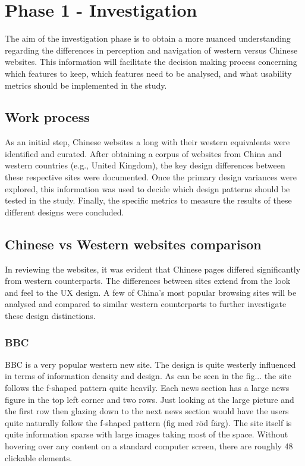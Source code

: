 
\chapter{Phase 1 - Investigation} %

\label{Chapter4} %

The aim of the investigation phase is to obtain a more nuanced understanding regarding the differences in perception and navigation of western versus Chinese websites. This information will facilitate the decision making process concerning which features to keep, which features need to be analysed, and what usability metrics should be implemented in the study. 

\section{Work process}
As an initial step, Chinese websites a long with their western equivalents were identified and curated. After obtaining a corpus of websites from China and western countries (e.g., United Kingdom), the key design differences between these respective sites were documented. Once the primary design variances were explored, this information was used to decide which design patterns should be tested in the study. Finally, the specific metrics to measure the results of these different designs were concluded. 


\section{Chinese vs Western websites comparison}
In reviewing the websites, it was evident that Chinese pages differed significantly from western  counterparts. The differences between sites extend from the look and feel to the UX design. A few of China's most popular browsing sites will be analysed and compared to similar western counterparts to further investigate these design distinctions. 
 
\subsection{BBC}
BBC is a very popular western new site. The design is quite westerly influenced in terms of information density and design. As can be seen in the fig... the site follows the f-shaped pattern quite heavily. Each news section has a large news figure in the top left corner and two rows. Just looking at the large picture and the first row then glazing down to the next news section would have the users quite naturally follow the f-shaped pattern (fig med röd färg). The site itself is quite information sparse with large images taking most of the space. Without hovering over any content on a standard computer screen, there are roughly 48 clickable elements.

